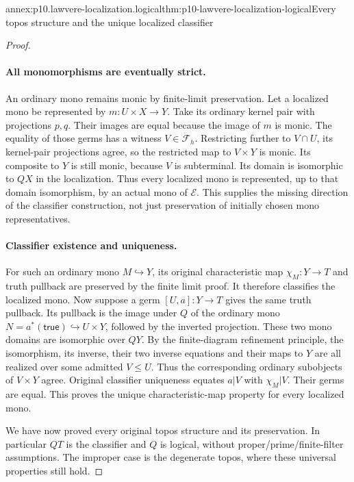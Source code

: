 \begin{annexitem}{annex:p10.lawvere-localization.logical}{thm:p10-lawvere-localization-logical}{Every topos structure and the unique localized classifier}
\begin{proof}
\paragraph{All monomorphisms are eventually strict.}
An ordinary mono remains monic by finite-limit
preservation.  Let a localized mono be
represented by \(m:U\times X\to Y\).
Take its ordinary kernel pair with projections
\(p,q\).  Their images are equal because
the image of \(m\) is monic.  The equality
of those germs has a witness \(V\in\mathcal F_h\).
Restricting further to \(V\cap U\), its
kernel-pair projections agree, so the
restricted map to \(V\times Y\) is monic.
Its composite to \(Y\) is still monic,
because \(V\) is subterminal.  Its domain
is isomorphic to \(QX\) in the localization.
Thus every localized mono is represented,
up to that domain isomorphism, by an actual
mono of \(\mathcal E\).  This supplies
the missing direction of the classifier
construction, not just preservation of
initially chosen mono representatives.

\paragraph{Classifier existence and uniqueness.}
For such an ordinary mono \(M\hookrightarrow Y\),
its original characteristic map \(\chi_M:Y\to T\)
and truth pullback are preserved by the finite
limit proof.  It therefore classifies the
localized mono.  Now suppose a germ
\([U,a]:Y\to T\) gives the same truth
pullback.  Its pullback is the image under
\(Q\) of the ordinary mono
\(N=a^*(\mathsf{true})\hookrightarrow U\times Y\),
followed by the inverted projection.  These
two mono domains are isomorphic over \(QY\).
By the finite-diagram refinement principle,
the isomorphism, its inverse, their two
inverse equations and their maps to \(Y\)
are all realized over some admitted
\(V\leq U\).  Thus the corresponding
ordinary subobjects of \(V\times Y\)
agree.  Original classifier uniqueness
equates \(a|V\) with \(\chi_M|V\).
Their germs are equal.  This proves the
unique characteristic-map property for
every localized mono.

We have now proved every original topos
structure and its preservation.  In particular
\(QT\) is the classifier and \(Q\) is
logical, without proper/prime/finite-filter
assumptions.  The improper case is the
degenerate topos, where these universal
properties still hold.


\end{proof}
\end{annexitem}
